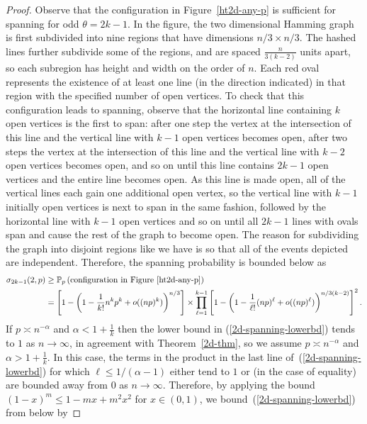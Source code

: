 \documentclass{amsart}
\numberwithin{equation}{section}
\theoremstyle{definition}
\theoremstyle{remark}
\begin{document}
\begin{proof}
Observe that the configuration in Figure~\ref{ht2d-any-p} is sufficient for spanning for odd $\theta = 2k-1$.  In the figure, the two dimensional Hamming graph is first subdivided into nine regions that have dimensions $n/3 \times n/3$.  The hashed lines further subdivide some of the regions, and are spaced $\frac{n}{3(k-2)}$ units apart, so each subregion has height and width on the order of $n$.  Each red oval represents the existence of at least one line (in the direction indicated) in that region with the specified number of open vertices.  To check that this configuration leads to spanning, observe that the horizontal line containing $k$ open vertices is the first to span: after one step the vertex at the intersection of this line and the vertical line with $k-1$ open vertices becomes open, after two steps the vertex at the intersection of this line and the vertical line with $k-2$ open vertices becomes open, and so on until this line contains $2k-1$ open vertices and the entire line becomes open.  As this line is made open, all of the vertical lines each gain one additional open vertex, so the vertical line with $k-1$ initially open vertices is next to span in the same fashion, followed by the horizontal line with $k-1$ open vertices and so on until all $2k-1$ lines with ovals span and cause the rest of the graph to become open.  The reason for subdividing the graph into disjoint regions like we have is so that all of the events depicted are independent.  Therefore, the spanning probability is bounded below as
\begin{equation}
\label{2d-spanning-lowerbd}
\begin{aligned}
\sigma_{2k-1}(2,p) &\geq \mathbb{P}_{p}\left(\text{configuration in Figure~\ref{ht2d-any-p}}\right) \\
&= \left[ 1 - \left( 1 - \frac{1}{k!} n^k p^k + o((np)^k) \right)^{n/3} \right] \times  \prod_{\ell = 1}^{k-1} \left[1 - \left(1 - \frac{1}{\ell !}(np)^{\ell} + o((np)^{\ell}) \right)^{n/3(k-2)} \right]^2.
\end{aligned}
\end{equation}
If $p \asymp n^{-\alpha}$ and $\alpha < 1 + \frac{1}{k}$ then the lower bound in (\ref{2d-spanning-lowerbd}) tends to $1$ as $n\to \infty$, in agreement with Theorem~\ref{2d-thm}, so we assume $p \asymp n^{-\alpha}$ and $\alpha > 1+\frac{1}{k}$.  In this case, the terms in the product in the last line of~(\ref{2d-spanning-lowerbd}) for which $\ell \leq 1/(\alpha-1)$ either tend to $1$ or (in the case of equality) are bounded away from $0$ as $n \to \infty$.  Therefore, by applying the bound $(1-x)^m \leq 1 - mx + m^2 x^2$ for $x\in(0,1)$, we bound~(\ref{2d-spanning-lowerbd}) from below by

\end{proof}
\end{document}

